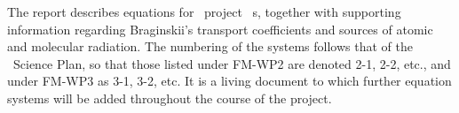 The report describes equations for \exc \ project \nep \ \Papp s,
together with supporting information regarding Braginskii's transport
coefficients and sources of atomic and  molecular radiation.  
The numbering of the systems follows that of the \nep\ Science Plan, so 
that those listed under FM-WP2 are denoted 2-1, 2-2, etc., and 
under FM-WP3 as 3-1, 3-2, etc. It is a living document to which further equation 
systems will be added throughout the course of the project.
